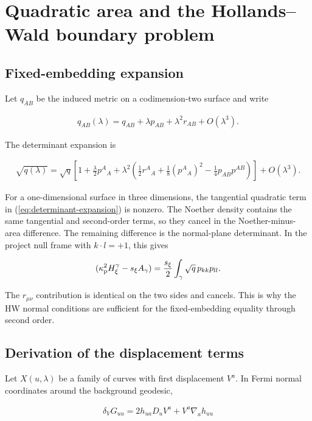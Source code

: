\section{Quadratic area and the Hollands--Wald boundary problem}\label{app:area-hw}

\subsection{Fixed-embedding expansion}

Let $q_{AB}$ be the induced metric on a codimension-two surface and write

\begin{align}
q_{AB}(\lambda)=q_{AB}+\lambda p_{AB}+\lambda^2r_{AB}+O(\lambda^3).
\end{align}

The determinant expansion is

\begin{align}
\sqrt{q(\lambda)}
=\sqrt q\left[
1+\frac\lambda2p^A{}_A
+\lambda^2\left(
\frac12r^A{}_A
+\frac18(p^A{}_A)^2
-\frac14p_{AB}p^{AB}
\right)
\right]+O(\lambda^3). \label{eq:determinant-expansion}
\end{align}

For a one-dimensional surface in three dimensions, the tangential quadratic term in (\ref{eq:determinant-expansion}) is nonzero. The Noether density contains the same tangential and second-order terms, so they cancel in the Noether-minus-area difference. The remaining difference is the normal-plane determinant. In the project null frame with $k\cdot l=+1$, this gives

\begin{align}
[\lambda^2](\kappa_{\rm p}^{2}H_\xi^\gamma-s_\xi A_\gamma)
=\frac{s_\xi}{2}\int_\gamma\sqrt q\,p_{kk}p_{ll}.
\end{align}

The $r_{\mu\nu}$ contribution is identical on the two sides and cancels. This is why the HW normal conditions are sufficient for the fixed-embedding equality through second order.

\subsection{Derivation of the displacement terms}

Let $X(u,\lambda)$ be a family of curves with first displacement $V^a$. In Fermi normal coordinates around the background geodesic,

\begin{align}
\delta_VG_{uu}=2h_{ua}D_uV^a+V^a\nabla_a h_{uu}
\end{align}

